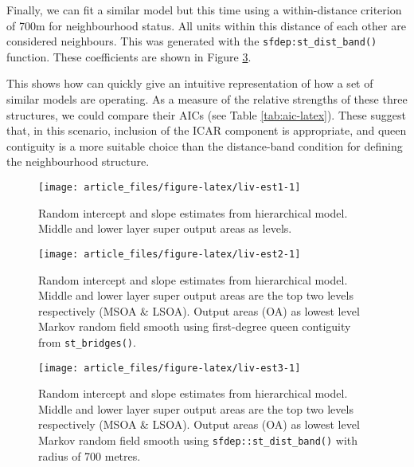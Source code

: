 Finally, we can fit a similar model but this time using a within-distance criterion of 700m for neighbourhood status. All units within this distance of each other are considered neighbours. This was generated with the \texttt{sfdep:st\_dist\_band()} function. These coefficients are shown in Figure \ref{fig:liv-est3}.

This shows how  can quickly give an intuitive representation of how a set of similar models are operating. As a measure of the relative strengths of these three structures, we could compare their AICs (see Table \ref{tab:aic-latex}). These suggest that, in this scenario, inclusion of the ICAR component is appropriate, and queen contiguity is a more suitable choice than the distance-band condition for defining the neighbourhood structure.

\begin{figure}

{\centering \texttt{[image: article\_files/figure-latex/liv-est1-1]} 

}

\caption{Random intercept and slope estimates from hierarchical model. Middle and lower layer super output areas as levels. }\label{fig:liv-est1}
\end{figure}



\begin{figure}

{\centering \texttt{[image: article\_files/figure-latex/liv-est2-1]} 

}

\caption{Random intercept and slope estimates from hierarchical model. Middle and lower layer super output areas are the top two levels respectively (MSOA \& LSOA). Output areas (OA) as lowest level Markov random field smooth using first-degree queen contiguity from \texttt{st\_bridges()}.}\label{fig:liv-est2}
\end{figure}



\begin{figure}

{\centering \texttt{[image: article\_files/figure-latex/liv-est3-1]} 

}

\caption{Random intercept and slope estimates from hierarchical model. Middle and lower layer super output areas are the top two levels respectively (MSOA \& LSOA). Output areas (OA) as lowest level Markov random field smooth using \texttt{sfdep::st\_dist\_band()} with radius of 700 metres.}\label{fig:liv-est3}
\end{figure}

